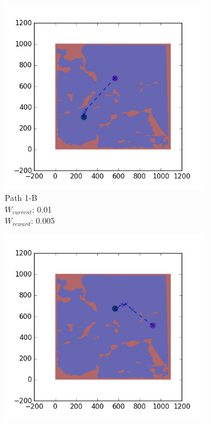\documentclass{tamuccthesis}
\begin{document}
\begin{figure}
    \begin{subfigure}[b]{0.24\textwidth}
        \centering
        \includegraphics[width=\textwidth,trim={4cm 3cm 2cm 3cm},clip]{EXP3RG_PathAb_-1_-1_0d01_0d005.png}
        \caption[]{{\small Path 1-B \\ $W_{current}$: 0.01 \\ $W_{reward}$: 0.005}}    
        \label{fig:Path_1-B_upReward_upWork_b}
    \end{subfigure}
    \begin{subfigure}[b]{0.24\textwidth}  
        \centering 
        \includegraphics[width=\textwidth,trim={4cm 3cm 2cm 3cm},clip]{EXP3RG_PathBb_-1_-1_0d01_0d005.png}

\end{subfigure}
\end{figure}
\end{document}
